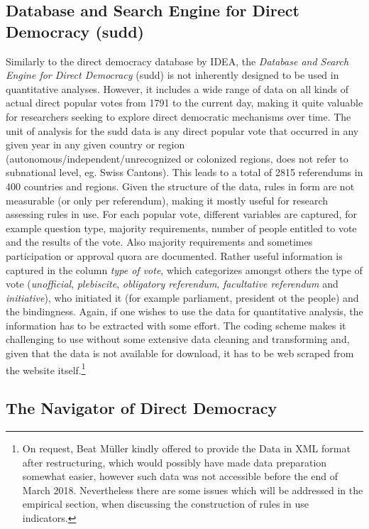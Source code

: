 \documentclass[]{article}
\let\rmarkdownfootnote\footnote%
\def\footnote{\protect\rmarkdownfootnote}
\begin{document}
\subsection{Database and Search Engine for Direct Democracy
(sudd)}\label{database-and-search-engine-for-direct-democracy-sudd}

Similarly to the direct democracy database by IDEA, the \emph{Database
and Search Engine for Direct Democracy} (sudd) is not inherently
designed to be used in quantitative analyses. However, it includes a
wide range of data on all kinds of actual direct popular votes from 1791
to the current day, making it quite valuable for researchers seeking to
explore direct democratic mechanisms over time. The unit of analysis for
the sudd data is any direct popular vote that occurred in any given year
in any given country or region (autonomous/independent/unrecognized or
colonized regions, does not refer to subnational level, eg. Swiss
Cantons). This leads to a total of 2815 referendums in 400 countries and
regions. Given the structure of the data, rules in form are not
measurable (or only per referendum), making it mostly useful for
research assessing rules in use. For each popular vote, different
variables are captured, for example question type, majority
requirements, number of people entitled to vote and the results of the
vote. Also majority requirements and sometimes participation or approval
quora are documented. Rather useful information is captured in the
column \emph{type of vote}, which categorizes amongst others the type of
vote (\emph{unofficial}, \emph{plebiscite}, \emph{obligatory
referendum}, \emph{facultative referendum} and \emph{initiative}), who
initiated it (for example parliament, president ot the people) and the
bindingness. Again, if one wishes to use the data for quantitative
analysis, the information has to be extracted with some effort. The
coding scheme makes it challenging to use without some extensive data
cleaning and transforming and, given that the data is not available for
download, it has to be web scraped from the website itself.\footnote{On
  request, Beat Müller kindly offered to provide the Data in XML format
  after restructuring, which would possibly have made data preparation
  somewhat easier, however such data was not accessible before the end
  of March 2018. Nevertheless there are some issues which will be
  addressed in the empirical section, when discussing the construction
  of rules in use indicators.}

\subsection{The Navigator of Direct
Democracy}\label{the-navigator-of-direct-democracy}
\end{document}
